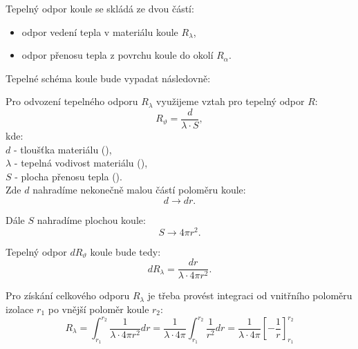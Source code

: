 \documentclass{article}
\begin{document}
Tepelný odpor koule se skládá ze dvou částí:
\begin{itemize}
    \item odpor vedení tepla v materiálu koule $R_\lambda$,
    \item odpor přenosu tepla z povrchu koule do okolí $R_\alpha$.
\end{itemize}

Tepelné schéma koule bude vypadat následovně:

\begin{center}
\end{center}


Pro odvození tepelného odporu $R_{\lambda}$ využijeme vztah pro tepelný odpor $R$:
$$
    R_{\vartheta} = \frac{d}{\lambda \cdot S},
$$
kde:\\
$d$ - tloušťka materiálu (\ueqM),\\
$\lambda$ - tepelná vodivost materiálu (\ueqWandMinvKinv),\\
$S$ - plocha přenosu tepla (\ueqMsq).\\

Zde $d$ nahradíme nekonečně malou částí poloměru koule:
$$
    d \rightarrow dr.
$$

Dále $S$ nahradíme plochou koule:
$$
    S \rightarrow 4 \pi r^2.
$$

Tepelný odpor $dR_{\vartheta}$ koule bude tedy:
$$
    dR_\lambda = \frac{dr}{\lambda \cdot 4 \pi r^2}.
$$

Pro získání celkového odporu $R_{\lambda}$ je třeba provést integraci od vnitřního poloměru izolace $r_1$ po vnější poloměr koule $r_2$:
$$
    R_\lambda = \int_{r_1}^{r_2} \frac{1}{\lambda \cdot 4 \pi r^2} dr = \frac{1}{\lambda \cdot 4 \pi} \int_{r_1}^{r_2} \frac{1}{r^2} dr = \frac{1}{\lambda \cdot 4 \pi} \left[ -\frac{1}{r} \right]_{r_1}^{r_2}
$$
\end{document}
